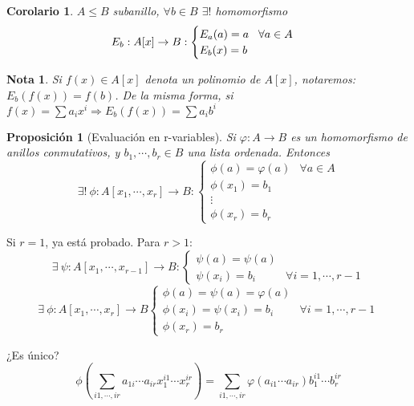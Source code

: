 \documentclass[11pt, a4paper, titlepage]{article}
\makeatletter
\renewenvironment{proof}[1][\proofname] {\vspace{-15pt}\par\pushQED{\qed}\normalfont\topsep6\p@\@plus6\p@\relax\trivlist\item[\hskip\labelsep\it#1\@addpunct{.}]\ignorespaces}{\popQED\endtrivlist\@endpefalse}
\theoremstyle{theorem-style}
\newtheorem*{nprop}{Proposición}
\newtheorem{ncor}{Corolario}
\theoremstyle{definition-style}
\theoremstyle{remark-style}
\newtheorem*{nota}{Nota}
\theoremstyle{example-style}
\makeatother
\begin{document}
\begin{ncor}
	$A \leq B$ subanillo, $\forall b \in B$ $\exists !$ homomorfismo
\[
E_b: A[x] \to B: \begin{cases}
E_a(a) = a \hspace{0.3cm} \forall a \in A\\
E_b(x) = b
	
\end{cases}
\] 
\end{ncor}

\begin{nota}
	Si $f(x)\in A[x]$ denota un polinomio de $A[x]$, notaremos: $E_b(f(x)) = f(b)$.
	De la misma forma, si $f(x) = \sum a_i x^i \Rightarrow E_b(f(x)) = \sum a_i b^i$
\end{nota}


\begin{nprop}[Evaluación en r-variables]
  Si $\varphi : A \longrightarrow B$ es un homomorfismo de anillos conmutativos, y $b_1,\cdots, b_r \in B$ una lista ordenada. Entonces
  \[
    \exists!\ \phi : A[x_1,\cdots,x_r] \longrightarrow B :\begin{cases}
      \phi(a) = \varphi(a) & \forall a\in A\\
      \phi(x_1) = b_1\\
      \vdots\\
      \phi(x_r) = b_r
    \end{cases}
  \]
\end{nprop}

\begin{proof}
  Si $r=1$, ya está probado. Para $r>1$:
  \[
    \exists\ \psi : A[x_1,\cdots,x_{r-1}] \longrightarrow B : \begin{cases}
      \psi(a) = \psi(a)\\
      \psi(x_i) = b_i & \forall i=1,\cdots,r-1
    \end{cases}
  \]
  \[  \exists\ \phi : A[x_1,\cdots,x_r] \longrightarrow B \begin{cases}
      \phi(a) = \psi(a) = \varphi(a)\\
      \phi(x_i) = \psi(x_i) = b_i &\forall i=1,\cdots,r-1\\
      \phi(x_r) = b_r
    \end{cases}
  \]
  
  ¿Es único?
  \[
    \phi(\sum_{i1,\cdots,ir} a_{1i}\cdots a_{ir}x_1^{i1}\cdots x_r^{ir} )= \sum _{i1,\cdots,ir} \varphi(a_{i1}\cdots a_{ir})b_1^{i1}\cdots b_r^{ir}
  \]
\end{proof}
\end{document}
